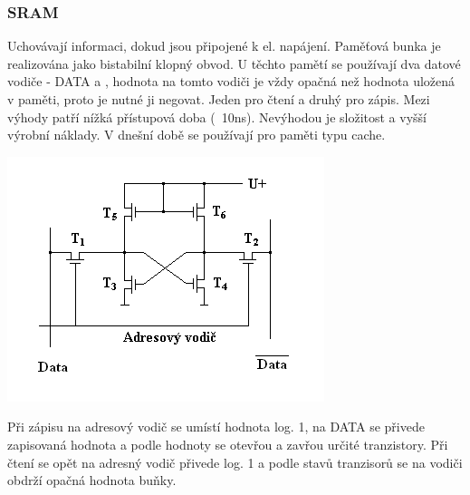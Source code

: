 \subsubsection{SRAM}
\begin{multicols}{2}
    Uchovávají informaci, dokud jsou připojené k el. napájení.
    Paměťová bunka je realizována jako bistabilní klopný obvod.
    U těchto pamětí se používají dva datové vodiče - DATA a , hodnota na tomto vodiči je vždy opačná než hodnota uložená v paměti, proto je nutné ji negovat.
    Jeden pro čtení a druhý pro zápis.
    Mezi výhody patří nížká přístupová doba (~10ns).
    Nevýhodou je složitost a vyšší výrobní náklady.
    V dnešní době se používají pro paměti typu cache.
    \columnbreak

    \includegraphics[width=0.8\linewidth]{TVY-POS/Polovodičové paměti/SRAMM.png}
\end{multicols}
Při zápisu na adresový vodič se umístí hodnota log. 1, na DATA se přivede zapisovaná hodnota a podle hodnoty se otevřou a zavřou určité tranzistory.
Při čtení se opět na adresný vodič přivede log. 1 a podle stavů tranzisorů se na vodiči  obdrží opačná hodnota buňky.
